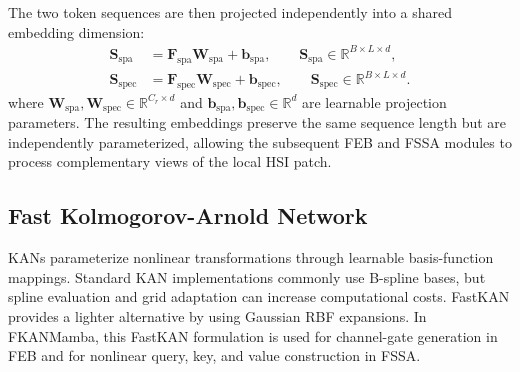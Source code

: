\documentclass{ieeeaccess}
\begin{document}
The two token sequences are then projected independently into a shared embedding dimension:
\begin{equation}
\begin{aligned}
\mathbf{S}_{\mathrm{spa}} &=
\mathbf{F}_{\mathrm{spa}}\mathbf{W}_{\mathrm{spa}}
+
\mathbf{b}_{\mathrm{spa}},
\qquad
\mathbf{S}_{\mathrm{spa}}\in\mathbb{R}^{B\times L\times d}, \\
\mathbf{S}_{\mathrm{spec}} &=
\mathbf{F}_{\mathrm{spec}}\mathbf{W}_{\mathrm{spec}}
+
\mathbf{b}_{\mathrm{spec}},
\qquad
\mathbf{S}_{\mathrm{spec}}\in\mathbb{R}^{B\times L\times d}.
\end{aligned}
\label{eq:tokens}
\end{equation}
where $\mathbf{W}_{\mathrm{spa}},\mathbf{W}_{\mathrm{spec}}\in\mathbb{R}^{C_r\times d}$ and
$\mathbf{b}_{\mathrm{spa}},\mathbf{b}_{\mathrm{spec}}\in\mathbb{R}^{d}$ are learnable projection parameters. The resulting embeddings preserve the same sequence length but are independently parameterized, allowing the subsequent FEB and FSSA modules to process complementary views of the local HSI patch.

\subsection{Fast Kolmogorov-Arnold Network}
\label{sec:fastkan}

KANs parameterize nonlinear transformations through learnable basis-function mappings. Standard KAN implementations commonly use B-spline bases, but spline evaluation and grid adaptation can increase computational costs. FastKAN \cite{ref29} provides a lighter alternative by using Gaussian RBF expansions. In FKANMamba, this FastKAN formulation is used for channel-gate generation in FEB and for nonlinear query, key, and value construction in FSSA.
\end{document}
